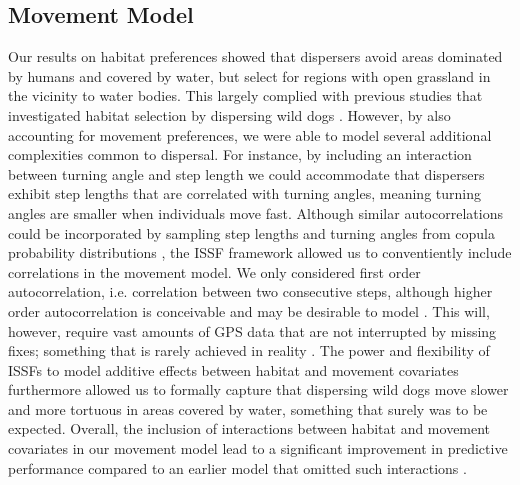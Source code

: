 \documentclass[abstract=on,10pt,a4paper,bibliography=totocnumbered]{article}
\begin{document}
\subsection{Movement Model}
Our results on habitat preferences showed that dispersers avoid areas dominated
by humans and covered by water, but select for regions with open grassland in
the vicinity to water bodies. This largely complied with previous studies that
investigated habitat selection by dispersing wild dogs
\citep{DaviesMostert.2012, Masenga.2016, Woodroffe.2019, Oneill.2020,
Hofmann.2021}. However, by also accounting for movement preferences, we were
able to model several additional complexities common to dispersal. For instance,
by including an interaction between turning angle and step length we could
accommodate that dispersers exhibit step lengths that are correlated with
turning angles, meaning turning angles are smaller when individuals move fast.
Although similar autocorrelations could be incorporated by sampling step lengths
and turning angles from copula probability distributions \citep{Hodel.2021a,
Hodel.2021b}, the ISSF framework allowed us to conventiently include
correlations in the movement model. We only considered first order
autocorrelation, i.e. correlation between two consecutive steps, although higher
order autocorrelation is conceivable and may be desirable to model
\citep{Dray.2010, McClintock.2012}. This will, however, require vast amounts of
GPS data that are not interrupted by missing fixes; something that is rarely
achieved in reality \citep{Graves.2006}. The power and flexibility of ISSFs to
model additive effects between habitat and movement covariates
\citep{Avgar.2016, Signer.2021} furthermore allowed us to formally capture that
dispersing wild dogs move slower and more tortuous in areas covered by water,
something that surely was to be expected. Overall, the inclusion of interactions
between habitat and movement covariates in our movement model lead to a
significant improvement in predictive performance compared to an earlier model
that omitted such interactions \citep{Hofmann.2021}.
\end{document}
